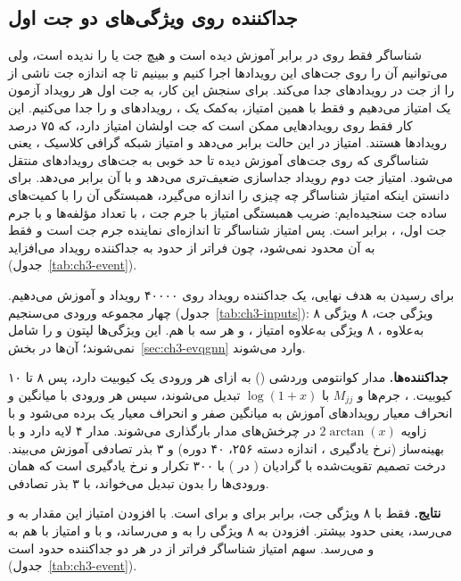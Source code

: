 \subsection{جداکننده روی ویژگی‌های دو جت اول}
\label{sub:ch3-jetfeat}
شناساگر فقط روی \Zjet در برابر \bbbb آموزش دیده است و هیچ جت \ttZ یا \ttbb را ندیده است، ولی می‌توانیم آن را روی جت‌های این رویدادها اجرا کنیم و ببینیم تا چه اندازه جت ناشی از \Zbos{} را از جت \bbbb در رویدادهای \ttbb جدا می‌کند. برای سنجش این کار، به جت اول هر رویداد آزمون یک امتیاز می‌دهیم و فقط با همین امتیاز، به‌کمک یک ، رویدادهای \ttZ و \ttbb را جدا می‌کنیم. این کار فقط روی رویدادهایی ممکن است که جت اولشان امتیاز دارد، که ۷۵ درصد رویدادها هستند. امتیاز  در این حالت  برابر  می‌دهد و امتیاز شبکه گرافی کلاسیک ، یعنی شناساگری که روی جت‌های \Zjet آموزش دیده تا حد خوبی به جت‌های رویدادهای \ttZ منتقل می‌شود. امتیاز جت دوم رویداد جداسازی ضعیف‌تری می‌دهد و  با آن  برابر  می‌دهد. برای دانستن اینکه امتیاز شناساگر چه چیزی را اندازه می‌گیرد، همبستگی آن را با کمیت‌های ساده جت سنجیده‌ایم: ضریب همبستگی امتیاز با جرم جت ، با تعداد مؤلفه‌ها  و با جرم  جت اول، ، برابر  است. پس امتیاز شناساگر تا اندازه‌ای نماینده جرم جت است و فقط به آن محدود نمی‌شود، چون فراتر از  حدود  به  جداکننده رویداد می‌افزاید (جدول~\ref{tab:ch3-event}).

برای رسیدن به هدف نهایی، یک جداکننده رویداد روی ۴۰۰۰۰ رویداد \ttZ و \ttbb آموزش می‌دهیم. چهار مجموعه ورودی می‌سنجیم (جدول~\ref{tab:ch3-inputs}): ۸ ویژگی جت، ۸ ویژگی به‌علاوه ، ۸ ویژگی به‌علاوه امتیاز ، و هر سه با هم. این ویژگی‌ها لپتون و  را شامل نمی‌شوند؛ آن‌ها در بخش~\ref{sec:ch3-evqgnn} وارد می‌شوند.

\textbf{جداکننده‌ها.} مدار کوانتومی وردشی () به ازای هر ورودی یک کیوبیت دارد، پس ۸ تا ۱۰ کیوبیت. \pt، جرم‌ها و $M_{jj}$ با $\log(1+x)$ تبدیل می‌شوند، سپس هر ورودی با میانگین و انحراف معیار رویدادهای آموزش به میانگین صفر و انحراف معیار یک برده می‌شود و با زاویه $2\arctan(x)$ در چرخش‌های مدار بارگذاری می‌شوند. مدار ۴ لایه دارد و با بهینه‌ساز  (نرخ یادگیری ، اندازه دسته ۲۵۶، ۴۰ دوره) و ۳ بذر تصادفی آموزش می‌بیند.  درخت تصمیم تقویت‌شده با گرادیان ( در ) با ۳۰۰ تکرار و نرخ یادگیری  است که همان ورودی‌ها را بدون تبدیل می‌خواند، با ۳ بذر تصادفی.

\textbf{نتایج.} فقط با ۸ ویژگی جت،  برابر  برای  و  برای  است. با افزودن امتیاز  این مقدار به  و  می‌رسد، یعنی حدود  بیشتر. افزودن  به ۸ ویژگی  را به  و  می‌رساند، و با  و امتیاز با هم به  و  می‌رسد. سهم امتیاز شناساگر فراتر از  در هر دو جداکننده حدود  است (جدول~\ref{tab:ch3-event}).


